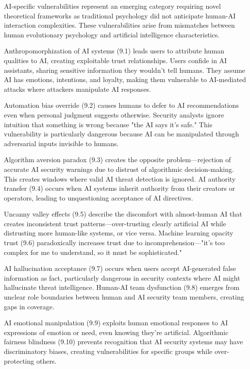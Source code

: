\documentclass[11pt,a4paper]{article}
\begin{document}
AI-specific vulnerabilities represent an emerging category requiring novel theoretical frameworks as traditional psychology did not anticipate human-AI interaction complexities. These vulnerabilities arise from mismatches between human evolutionary psychology and artificial intelligence characteristics.

Anthropomorphization of AI systems (9.1) leads users to attribute human qualities to AI, creating exploitable trust relationships. Users confide in AI assistants, sharing sensitive information they wouldn't tell humans. They assume AI has emotions, intentions, and loyalty, making them vulnerable to AI-mediated attacks where attackers manipulate AI responses.

Automation bias override (9.2) causes humans to defer to AI recommendations even when personal judgment suggests otherwise. Security analysts ignore intuition that something is wrong because "the AI says it's safe." This vulnerability is particularly dangerous because AI can be manipulated through adversarial inputs invisible to humans.

Algorithm aversion paradox (9.3) creates the opposite problem—rejection of accurate AI security warnings due to distrust of algorithmic decision-making. This creates windows where valid AI threat detection is ignored. AI authority transfer (9.4) occurs when AI systems inherit authority from their creators or operators, leading to unquestioning acceptance of AI directives.

Uncanny valley effects (9.5) describe the discomfort with almost-human AI that creates inconsistent trust patterns—over-trusting clearly artificial AI while distrusting more human-like systems, or vice versa. Machine learning opacity trust (9.6) paradoxically increases trust due to incomprehension—"it's too complex for me to understand, so it must be sophisticated."

AI hallucination acceptance (9.7) occurs when users accept AI-generated false information as fact, particularly dangerous in security contexts where AI might hallucinate threat intelligence. Human-AI team dysfunction (9.8) emerges from unclear role boundaries between human and AI security team members, creating gaps in coverage.

AI emotional manipulation (9.9) exploits human emotional responses to AI expressions of emotion or need, even knowing they're artificial. Algorithmic fairness blindness (9.10) prevents recognition that AI security systems may have discriminatory biases, creating vulnerabilities for specific groups while over-protecting others.
\end{document}
